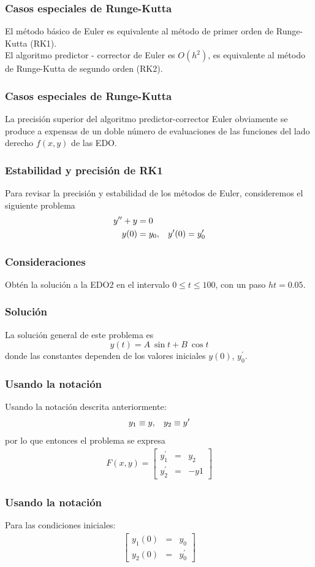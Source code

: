 \begin{frame}
\frametitle{Casos especiales de Runge-Kutta}
El método básico de Euler es equivalente al método de primer orden de Runge-Kutta (RK1).
\\
\bigskip
El algoritmo predictor - corrector de Euler es $O(h^2)$, es equivalente al método de Runge-Kutta de segundo orden (RK2). 
\end{frame}
\begin{frame}
\frametitle{Casos especiales de Runge-Kutta}
La precisión superior del algoritmo predictor-corrector Euler obviamente se produce a expensas de un doble número de evaluaciones de las funciones del lado derecho $f(x, y)$ de las EDO.
\end{frame}
\begin{frame}
\frametitle{Estabilidad y precisión de RK1}
Para revisar la precisión y estabilidad de los métodos de Euler, consideremos el siguiente problema
\begin{align}
y^{\prime \prime} + y &= 0 \label{eq:ecuacion_12_19} \\
y(0) &=  y_{0}, \hspace{0.3cm} y^{\prime}(0) = y^{\prime}_{0} \label{ec:ecuacion_12_20}
\end{align}
\end{frame}
\begin{frame}
\frametitle{Consideraciones}
Obtén la solución a la EDO2 en el intervalo $0 \leq t \leq 100$, con un paso $ht=0.05$.
\end{frame}
\begin{frame}
\frametitle{Solución}
La solución general de este problema es
\[ y(t) = A \: \sin t + B \: \cos t \]
donde las constantes dependen de los valores iniciales $y(0)$, $y^{\prime}_{0}$.
\end{frame}
\begin{frame}
\frametitle{Usando la notación}
Usando la notación descrita anteriormente:
\[ y_{1} \equiv y, \hspace{0.3cm} y_{2} \equiv y^{\prime} \]
por lo que entonces el problema se expresa
\begin{align}
F(x, y) = \begin{bmatrix}
y^{\prime}_{1} &=& y_{2} \\
y^{\prime}_{2} &=& - y{1}
\end{bmatrix}
\end{align}
\end{frame}
\begin{frame}
\frametitle{Usando la notación}
Para las condiciones iniciales:
\begin{align}
\begin{bmatrix}
y_{1}(0) &=& y_{0} \\
y_{2}(0) &=& y^{\prime}_{0}
\end{bmatrix}
\end{align}
\end{frame}
